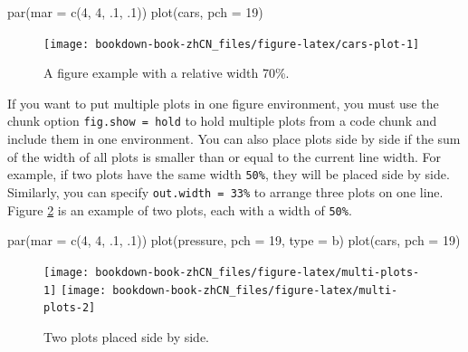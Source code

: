 \documentclass[
  12pt,
]{krantz}
\newenvironment{Shaded}{\begin{snugshade}}{\end{snugshade}}
\newcommand{\AttributeTok}[1]{\textcolor[rgb]{0.77,0.63,0.00}{#1}}
\newcommand{\DecValTok}[1]{\textcolor[rgb]{0.00,0.00,0.81}{#1}}
\newcommand{\FunctionTok}[1]{\textcolor[rgb]{0.00,0.00,0.00}{#1}}
\newcommand{\NormalTok}[1]{#1}
\newcommand{\StringTok}[1]{\textcolor[rgb]{0.31,0.60,0.02}{#1}}
\theoremstyle{definition}
\theoremstyle{definition}
\theoremstyle{definition}
\theoremstyle{definition}
\theoremstyle{remark}
\begin{document}
\begin{Shaded}
\begin{Highlighting}[]
\FunctionTok{par}\NormalTok{(}\AttributeTok{mar =} \FunctionTok{c}\NormalTok{(}\DecValTok{4}\NormalTok{, }\DecValTok{4}\NormalTok{, .}\DecValTok{1}\NormalTok{, .}\DecValTok{1}\NormalTok{))}
\FunctionTok{plot}\NormalTok{(cars, }\AttributeTok{pch =} \DecValTok{19}\NormalTok{)}
\end{Highlighting}
\end{Shaded}

\begin{figure}
\texttt{[image: bookdown-book-zhCN\_files/figure-latex/cars-plot-1]} \caption{A figure example with a relative width 70\%.}\label{fig:cars-plot}
\end{figure}

If you want to put multiple plots in one figure environment, you must use the chunk option \texttt{fig.show\ =\ \textquotesingle{}hold\textquotesingle{}} to hold multiple plots from a code chunk and include them in one environment. You can also place plots side by side if the sum of the width of all plots is smaller than or equal to the current line width. For example, if two plots have the same width \texttt{50\%}, they will be placed side by side. Similarly, you can specify \texttt{out.width\ =\ \textquotesingle{}33\%\textquotesingle{}} to arrange three plots on one line. Figure \ref{fig:multi-plots} is an example of two plots, each with a width of \texttt{50\%}.

\begin{Shaded}
\begin{Highlighting}[]
\FunctionTok{par}\NormalTok{(}\AttributeTok{mar =} \FunctionTok{c}\NormalTok{(}\DecValTok{4}\NormalTok{, }\DecValTok{4}\NormalTok{, .}\DecValTok{1}\NormalTok{, .}\DecValTok{1}\NormalTok{))}
\FunctionTok{plot}\NormalTok{(pressure, }\AttributeTok{pch =} \DecValTok{19}\NormalTok{, }\AttributeTok{type =} \StringTok{\textquotesingle{}b\textquotesingle{}}\NormalTok{)}
\FunctionTok{plot}\NormalTok{(cars, }\AttributeTok{pch =} \DecValTok{19}\NormalTok{)}
\end{Highlighting}
\end{Shaded}

\begin{figure}
\texttt{[image: bookdown-book-zhCN\_files/figure-latex/multi-plots-1]} \texttt{[image: bookdown-book-zhCN\_files/figure-latex/multi-plots-2]} \caption{Two plots placed side by side.}\label{fig:multi-plots}
\end{figure}
\end{document}
